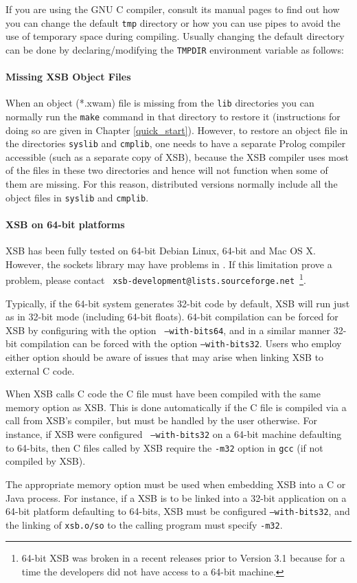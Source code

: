 
\noindent
If you are using the GNU C compiler, consult its manual pages
to find out how you can change the default {\tt tmp} directory or how you
can use pipes to avoid the use of temporary space during compiling.
Usually changing the default directory can be done by declaring/modifying
the {\tt TMPDIR} environment variable as follows:


\paragraph*{Missing XSB Object Files}
When an object (*.xwam) file is missing from the {\tt lib} directories
you can normally run the {\tt make} command in that directory to
restore it (instructions for doing so are given in Chapter
\ref{quick_start}).  However, to restore an object file in the
directories {\tt syslib} and {\tt cmplib}, one needs to have a
separate Prolog compiler accessible (such as a separate copy of
XSB), because the XSB compiler uses most of the files in these
two directories and hence will not function when some of them are
missing.  For this reason, distributed versions normally include all
the object files in {\tt syslib} and {\tt cmplib}.

\paragraph*{XSB on 64-bit platforms}
%
XSB has been fully tested on 64-bit Debian Linux, 64-bit and Mac OS X.
However, the sockets library may have problems in \version{}.  If this
limitation prove a problem, please contact {\tt
  xsb-development@lists.sourceforge.net}~\footnote{64-bit XSB was
  broken in a recent releases prior to Version 3.1 because for a time
  the developers did not have access to a 64-bit machine.}.

Typically, if the 64-bit system generates 32-bit code by default, XSB
will run just as in 32-bit mode (including 64-bit floats).  64-bit
compilation can be forced for XSB by configuring with the option {\tt
  --with-bits64}, and in a similar manner 32-bit compilation can be
forced with the option {\tt --with-bits32}.  Users who employ either
option should be aware of issues that may arise when linking XSB to
external C code.  
\bi
\item When XSB calls C code the C file must have been compiled with
  the same memory option as XSB.  This is done automatically if the C
  file is compiled via a call from XSB's compiler, but must be handled
  by the user otherwise.  For instance, if XSB were configured {\tt
    --with-bits32} on a 64-bit machine defaulting to 64-bits, then C
  files called by XSB require the {\tt -m32} option in {\tt gcc} (if
  not compiled by XSB).
\item The appropriate memory option must be used when embedding XSB
  into a C or Java process.  For instance, if a XSB is to be linked
  into a 32-bit application on a 64-bit platform defaulting to
  64-bits, XSB must be configured {\tt --with-bits32}, and the linking
  of {\tt xsb.o/so} to the calling program must specify {\tt -m32}.
  \ei

